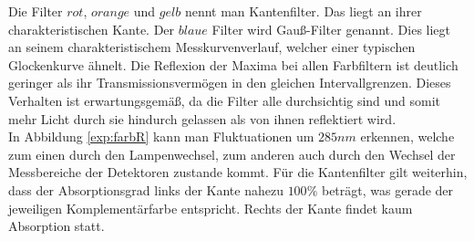         Die Filter $rot$, $orange$ und $gelb$ nennt man Kantenfilter. Das liegt an ihrer charakteristischen Kante. Der $blaue$ Filter wird Gauß-Filter genannt. Dies liegt an seinem charakteristischem Messkurvenverlauf, welcher einer typischen Glockenkurve ähnelt. Die Reflexion der Maxima bei allen Farbfiltern ist deutlich geringer als ihr Transmissionsvermögen in den gleichen Intervallgrenzen. Dieses Verhalten ist erwartungsgemäß, da die Filter alle durchsichtig sind und somit mehr Licht durch sie hindurch gelassen als von ihnen reflektiert wird.\\
        In Abbildung \ref{exp:farbR} kann man Fluktuationen um $285\unit{nm}$ erkennen, welche zum einen durch den Lampenwechsel, zum anderen auch durch den Wechsel der Messbereiche der Detektoren zustande kommt.
        Für die Kantenfilter gilt weiterhin, dass der Absorptionsgrad links der Kante nahezu $100\unit{\%}$ beträgt, was gerade der jeweiligen Komplementärfarbe entspricht. Rechts der Kante findet kaum Absorption statt.
